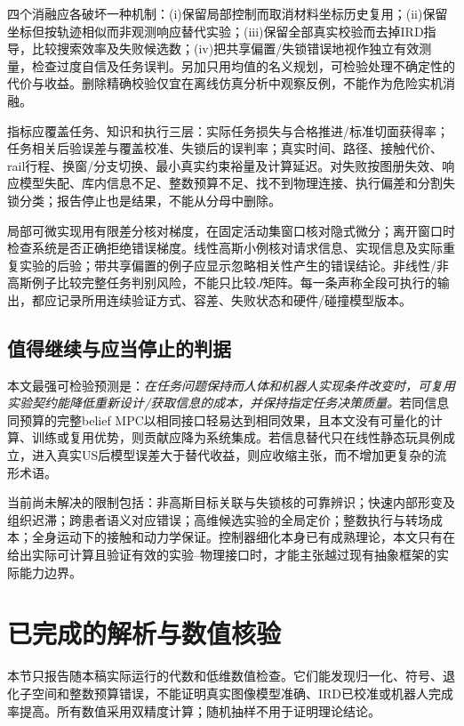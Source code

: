 \documentclass[11pt,a4paper]{article}
\numberwithin{equation}{section}
\theoremstyle{definition}
\begin{document}
四个消融应各破坏一种机制：(i)保留局部控制而取消材料坐标历史复用；(ii)保留坐标但按轨迹相似而非观测响应替代实验；(iii)保留全部真实校验而去掉IRD指导，比较搜索效率及失败候选数；(iv)把共享偏置/失锁错误地视作独立有效测量，检查过度自信及任务误判。另加只用均值的名义规划，可检验处理不确定性的代价与收益。删除精确校验仅宜在离线仿真分析中观察反例，不能作为危险实机消融。

指标应覆盖任务、知识和执行三层：实际任务损失与合格推进/标准切面获得率；任务相关后验误差与覆盖校准、失锁后的误判率；真实时间、路径、接触代价、rail行程、换窗/分支切换、最小真实约束裕量及计算延迟。对失败按图册失效、响应模型失配、库内信息不足、整数预算不足、找不到物理连接、执行偏差和分割失锁分类；报告停止也是结果，不能从分母中删除。

局部可微实现用有限差分核对梯度，在固定活动集窗口核对隐式微分；离开窗口时检查系统是否正确拒绝错误梯度。线性高斯小例核对请求信息、实现信息及实际重复实验的后验；带共享偏置的例子应显示忽略相关性产生的错误结论。非线性/非高斯例子比较完整任务判别风险，不能只比较$J$矩阵。每一条声称全段可执行的输出，都应记录所用连续验证方式、容差、失败状态和硬件/碰撞模型版本。

\subsection{值得继续与应当停止的判据}

本文最强可检验预测是：\emph{在任务问题保持而人体和机器人实现条件改变时，可复用实验契约能降低重新设计/获取信息的成本，并保持指定任务决策质量。}若同信息同预算的完整belief MPC以相同接口轻易达到相同效果，且本文没有可量化的计算、训练或复用优势，则贡献应降为系统集成。若信息替代只在线性静态玩具例成立，进入真实US后模型误差大于替代收益，则应收缩主张，而不增加更复杂的流形术语。

当前尚未解决的限制包括：非高斯目标关联与失锁核的可靠辨识；快速内部形变及组织迟滞；跨患者语义对应错误；高维候选实验的全局定价；整数执行与转场成本；全身运动下的接触和动力学保证。控制器细化本身已有成熟理论\cite{reissig2017}，本文只有在给出实际可计算且验证有效的实验--物理接口时，才能主张越过现有抽象框架的实际能力边界。


\section{已完成的解析与数值核验}
\label{num:section}
本节只报告随本稿实际运行的代数和低维数值检查。它们能发现归一化、符号、退化子空间和整数预算错误，不能证明真实图像模型准确、IRD已校准或机器人完成率提高。所有数值采用双精度计算；随机抽样不用于证明理论结论。
\end{document}
